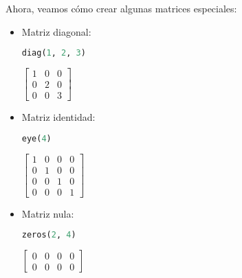 \documentclass[a4,11pt]{aleph-notas}
\begin{document}
Ahora, veamos cómo crear algunas matrices especiales:
\begin{itemize}
\item
    Matriz diagonal:
\begin{pycodigo}
    \begin{ipynbcodigo}\begin{lstlisting}[language=Python]
diag(1, 2, 3)
    \end{lstlisting}\end{ipynbcodigo}
    \begin{ipynbsalida}[2mm]
$\displaystyle \left[\begin{matrix}1 & 0 & 0\\0 & 2 & 0\\0 & 0 & 3\end{matrix}\right]$
    \end{ipynbsalida}
\end{pycodigo}

\item
    Matriz identidad:
\begin{pycodigo}
    \begin{ipynbcodigo}\begin{lstlisting}[language=Python]
eye(4)
    \end{lstlisting}\end{ipynbcodigo}
    \begin{ipynbsalida}[2mm]
$\displaystyle \left[\begin{matrix}1 & 0 & 0 & 0\\0 & 1 & 0 & 0\\0 & 0 & 1 & 0\\0 & 0 & 0 & 1\end{matrix}\right]$
    \end{ipynbsalida}
\end{pycodigo}

\item
    Matriz nula:
\begin{pycodigo}
    \begin{ipynbcodigo}\begin{lstlisting}[language=Python]
zeros(2, 4)
    \end{lstlisting}\end{ipynbcodigo}
    \begin{ipynbsalida}[2mm]
$\displaystyle \left[\begin{matrix}0 & 0 & 0 & 0\\0 & 0 & 0 & 0\end{matrix}\right]$
    \end{ipynbsalida}
\end{pycodigo}


\end{itemize}
\end{document}
